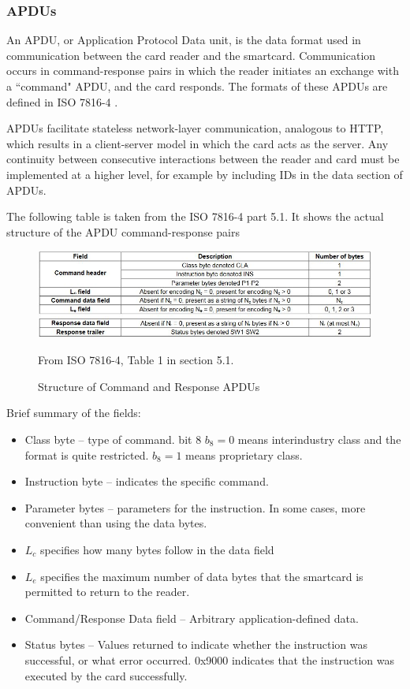 \documentclass[12pt,a4paper]{article}
\begin{document}
\subsubsection{APDUs}
An APDU, or Application Protocol Data unit, is the data format used in communication between the card reader and the smartcard. Communication occurs in command-response pairs in which the reader initiates an exchange with a ``command" APDU, and the card responds. The formats of these APDUs are defined in ISO 7816-4 \cite{TODO}.

APDUs facilitate stateless network-layer communication, analogous to HTTP, which results in a client-server model in which the card acts as the server. Any continuity between consecutive interactions between the reader and card must be implemented at a higher level, for example by including IDs in the data section of APDUs.

The following table is taken from the ISO 7816-4 part 5.1. It shows the actual structure of the APDU command-response pairs

\begin{figure} [ht]
	\centering
	\includegraphics[scale=0.7]{introduction/apdus}
	\caption{Structure of Command and Response APDUs}
	From ISO 7816-4, Table 1 in section 5.1.
\end{figure}

Brief summary of the fields:

\begin{itemize}
	\item  Class byte -- type of command. bit 8 $b_8=0$ means interindustry class and the format is quite restricted. $b_8=1$ means proprietary class.
	
	\item Instruction byte -- indicates the specific command.
	
	\item Parameter bytes -- parameters for the instruction. In some cases, more convenient than using the data bytes.
	
	\item $L_c$ specifies how many bytes follow in the data field
	
	\item $L_e$ specifies the maximum number of data bytes that the smartcard is permitted to return to the reader.
	
	\item Command/Response Data field -- Arbitrary application-defined data.
	
	\item Status bytes -- Values returned to indicate whether the instruction was successful, or what error occurred. 0x9000 indicates that the instruction was executed by the card successfully. 
\end{itemize}
\end{document}
